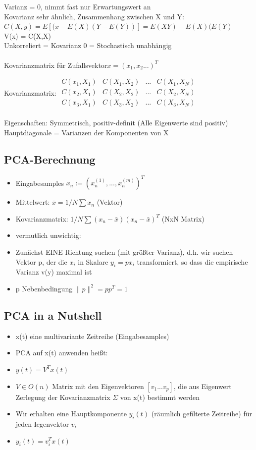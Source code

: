 \documentclass[a4paper,10pt,oneside]{article}
\begin{document}
Varianz = 0, nimmt fast nur Erwartungswert an\\
Kovarianz sehr ähnlich, Zusammenhang zwischen X und Y:\\
$C(X,y) = E[(x-E(X)(Y-E(Y))] = E(XY)-E(X)(E(Y)$\\
V(x) = C(X,X)\\
Unkorreliert = Kovarianz 0 = Stochastisch unabhängig\\
\\
Kovarianzmatrix für Zufallsvektor$ x=(x_1, x_2...)^T$

Kovarianzmatrix:
$\begin{matrix}
	C(x_1, X_1) & C(X_1, X_2) & ... & C(X_1, X_N) \\
	C(x_2, X_1) & C(X_2, X_2) & ... & C(X_2, X_N) \\
	C(x_3, X_1) & C(X_3, X_2) & ... & C(X_3, X_N) \\
\end{matrix}$

Eigenschaften: Symmetrisch, positiv-definit (Alle Eigenwerte sind positiv)\\
Hauptdiagonale = Varianzen der Komponenten von X\\


\subsection{PCA-Berechnung}
\begin{itemize}
	\item Eingabesamples $x_n:=(x_n^{(1)}, ..., x_n^{(m)})^T$
	\item Mittelwert: $\bar{x} = 1/N \sum x_n$ (Vektor)
	\item Kovarianzmatrix: $1/N \sum (x_n - \bar{x})(x_n-\bar{x})^T$ (NxN Matrix)
	\item vermutlich unwichtig:	
	\item Zunächst EINE Richtung suchen (mit größter Varianz), d.h. wir suchen Vektor p, der die $x_i$ in Skalare $y_i = px_i$ transformiert, so dass die empirische Varianz v(y) maximal ist
	\item p Nebenbedingung $\|p\|^2= pp^T = 1$
\end{itemize}

\subsection{PCA in a Nutshell}
\begin{itemize}
	\item x(t) eine multivariante Zeitreihe (Eingabesamples)
	\item PCA auf x(t) anwenden heißt:
	\item $y(t) = V^Tx(t)$
	\item $V \in O(n)$ Matrix mit den Eigenvektoren $[v_1...v_p]$, die aus Eigenwert Zerlegung der Kovarianzmatrix $\Sigma$ von x(t) bestimmt werden
	\item Wir erhalten eine Hauptkomponente $y_i(t)$ (räumlich gefilterte Zeitreihe) für jeden Iegenvektor $v_i$
	\item $y_i(t)=v_i^Tx(t)$
\end{itemize}
\end{document}
